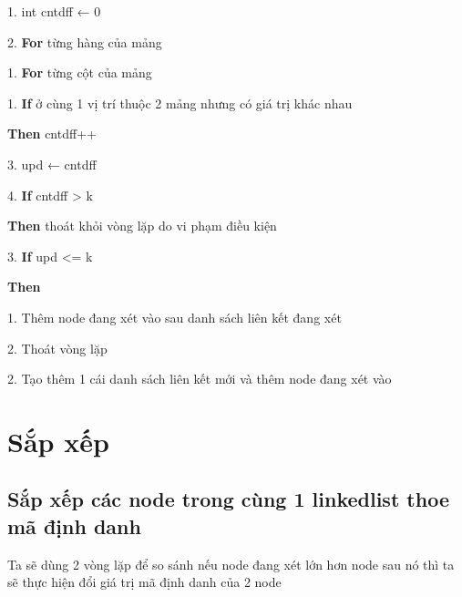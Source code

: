 \documentclass [14pt, a4paper]{report}
\begin{document}
           \hspace{2cm} 	1.  int cntdff ← 0
           
           
           \hspace{2cm} 	2.  \textbf{For} từng hàng của mảng
           
           
                \hspace{3cm}		1.  \textbf{For} từng cột của mảng
                
                
                    	\hspace{4cm}		1.  \textbf{If} ở cùng 1 vị trí thuộc 2 mảng nhưng có giá trị khác nhau
                    	
                    	
                    	\hspace{5cm}			\textbf{Then}   cntdff++
                    	
                    	
           	\hspace{2cm}	3.  upd ← cntdff
           	
           	
           \hspace{2cm} 	4.  \textbf{If} cntdff > k
           
           
            	\hspace{3cm}	\textbf{Then}  thoát khỏi vòng lặp do vi phạm điều kiện
            	
            	
  \hspace{1cm}      	3.  \textbf{If} upd <= k
  
  
        	\hspace{2cm}	\textbf{Then}
        	
        	
            	\hspace{3cm}	1.  Thêm node đang xét vào sau danh sách liên kết đang xét
            	
            	
            	\hspace{3cm}	2.  Thoát vòng lặp
            	
            	
    2.  Tạo thêm 1 cái danh sách liên kết mới và thêm node đang xét vào

   
\section{Sắp xếp}
\subsection{Sắp xếp các node trong cùng 1 linkedlist thoe mã định danh}
Ta sẽ dùng 2 vòng lặp để so sánh nếu node đang xét lớn hơn node sau nó thì ta sẽ thực hiện đổi giá trị mã định danh của 2 node\
\end{document}
